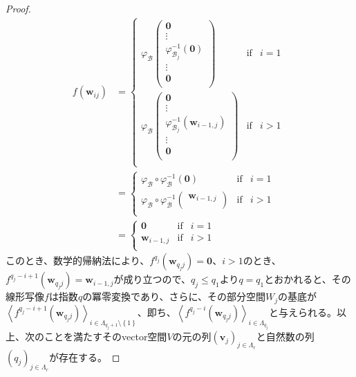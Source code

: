 \documentclass[dvipdfmx]{jsarticle}
\begin{document}
\begin{proof}
\begin{align*}
f\left( \mathbf{w}_{ij} \right) &= \left\{ \begin{matrix}
\varphi_{\mathcal{B}}\begin{pmatrix}
\mathbf{0} \\
 \vdots \\
\varphi_{\mathcal{B}_{j}}^{- 1}\left( \mathbf{0} \right) \\
 \vdots \\
\mathbf{0} \\
\end{pmatrix} & \mathrm{if} & i = 1 \\
\varphi_{\mathcal{B}}\begin{pmatrix}
\mathbf{0} \\
 \vdots \\
\varphi_{\mathcal{B}_{j}}^{- 1}\left( \mathbf{w}_{i - 1,j} \right) \\
 \vdots \\
\mathbf{0} \\
\end{pmatrix} & \mathrm{if} & i > 1 \\
\end{matrix} \right.\ \\
&= \left\{ \begin{matrix}
\varphi_{\mathcal{B}} \circ \varphi_{\mathcal{B}}^{- 1}\left( \mathbf{0} \right) & \mathrm{if} & i = 1 \\
\varphi_{\mathcal{B}} \circ \varphi_{\mathcal{B}}^{- 1}\begin{pmatrix}
\mathbf{w}_{i - 1,j} \\
\end{pmatrix} & \mathrm{if} & i > 1 \\
\end{matrix} \right.\ \\
&= \left\{ \begin{matrix}
\mathbf{0} & \mathrm{if} & i = 1 \\
\mathbf{w}_{i - 1,j} & \mathrm{if} & i > 1 \\
\end{matrix} \right.\ 
\end{align*}
このとき、数学的帰納法により、$f^{q_{j}}\left( \mathbf{w}_{q_{j}j} \right) = \mathbf{0}$、$i > 1$のとき、$f^{q_{j} - i + 1}\left( \mathbf{w}_{q_{j}j} \right) = \mathbf{w}_{i - 1,j}$が成り立つので、$q_{j} \leq q_{1}$より$q = q_{1}$とおかれると、その線形写像$f$は指数$q$の冪零変換であり、さらに、その部分空間$W_{j}$の基底が$\left\langle f^{q_{j} - i + 1}\left( \mathbf{w}_{q_{j}j} \right) \right\rangle_{i \in \varLambda_{q_{j} + 1} \setminus \left\{ 1 \right\}}$、即ち、$\left\langle f^{q_{j} - i}\left( \mathbf{w}_{q_{j}j} \right) \right\rangle_{i \in \varLambda_{q_{j}}}$と与えられる。以上、次のことを満たすそのvector空間$V$の元の列$\left( \mathbf{v}_{j} \right)_{j \in \varLambda_{r}}$と自然数の列$\left( q_{j} \right)_{j \in \varLambda_{r}}$が存在する。

\end{proof}
\end{document}
